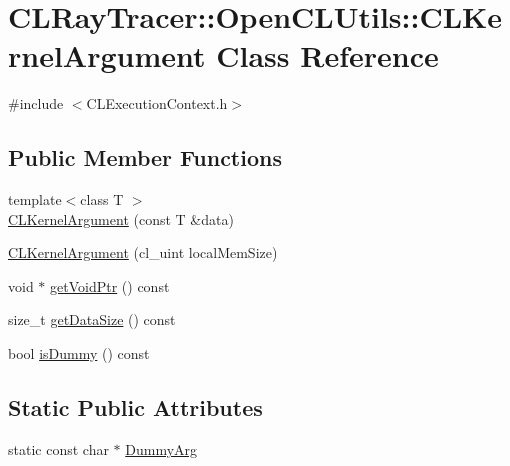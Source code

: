 \hypertarget{class_c_l_ray_tracer_1_1_open_c_l_utils_1_1_c_l_kernel_argument}{}\section{C\+L\+Ray\+Tracer\+:\+:Open\+C\+L\+Utils\+:\+:C\+L\+Kernel\+Argument Class Reference}
\label{class_c_l_ray_tracer_1_1_open_c_l_utils_1_1_c_l_kernel_argument}


{\ttfamily \#include $<$C\+L\+Execution\+Context.\+h$>$}

\subsection*{Public Member Functions}
\begin{DoxyCompactItemize}
\item 
{\footnotesize template$<$class T $>$ }\\\hyperlink{class_c_l_ray_tracer_1_1_open_c_l_utils_1_1_c_l_kernel_argument_ad4a2f6eeb0021cc7af9bffed5ffad0f0}{C\+L\+Kernel\+Argument} (const T \&data)
\item 
\hyperlink{class_c_l_ray_tracer_1_1_open_c_l_utils_1_1_c_l_kernel_argument_a8c1b6453792f8623bb9e03f112ce48ae}{C\+L\+Kernel\+Argument} (cl\+\_\+uint local\+Mem\+Size)
\item 
void $\ast$ \hyperlink{class_c_l_ray_tracer_1_1_open_c_l_utils_1_1_c_l_kernel_argument_a9a9131d7c5dbdfcae7187e559ef18bd8}{get\+Void\+Ptr} () const 
\item 
size\+\_\+t \hyperlink{class_c_l_ray_tracer_1_1_open_c_l_utils_1_1_c_l_kernel_argument_ac563b112959bf8b66e875e017b60f196}{get\+Data\+Size} () const 
\item 
bool \hyperlink{class_c_l_ray_tracer_1_1_open_c_l_utils_1_1_c_l_kernel_argument_aa32628bdad331d091ca2b31b053dabff}{is\+Dummy} () const 
\end{DoxyCompactItemize}
\subsection*{Static Public Attributes}
\begin{DoxyCompactItemize}
\item 
static const char $\ast$ \hyperlink{class_c_l_ray_tracer_1_1_open_c_l_utils_1_1_c_l_kernel_argument_a08d988445003da2332783b18eef8f23f}{Dummy\+Arg}
\end{DoxyCompactItemize}


